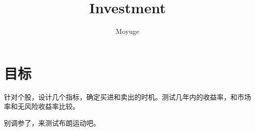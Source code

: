 \documentclass[]{report}
\title{Investment}
\author{Moyuge}
\begin{document}
\maketitle

\begin{abstract}
\end{abstract}

\section{目标}
针对个股，设计几个指标，确定买进和卖出的时机。测试几年内的收益率，和市场率和无风险收益率比较。

别调参了，来测试布朗运动吧。
\end{document}
